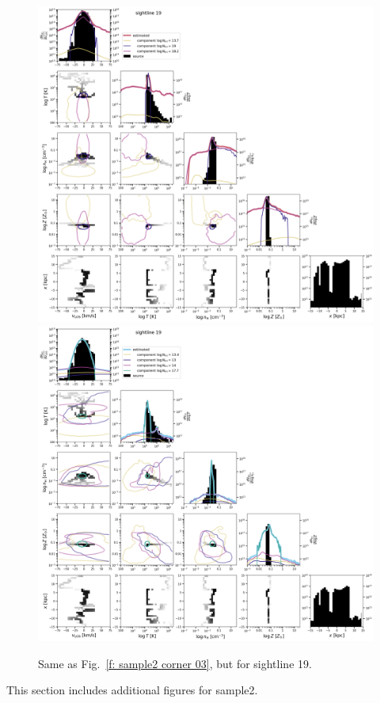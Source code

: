 \documentclass[fleqn,usenatbib]{mnras}
\begin{document}
\begin{figure}
    \centering
    \includegraphics[height=0.45\textheight]{figures/sample2/original/sightline_0019.png}
    \includegraphics[height=0.45\textheight]{figures/sample2/high-z/sightline_0019.png}
    \label{f: sample2 19 corner}
    \caption{Same as Fig.~\ref{f: sample2 corner 03}, but for sightline 19.}
\end{figure}

This section includes additional figures for sample2.



\bsp	%
\label{lastpage}
\end{document}
